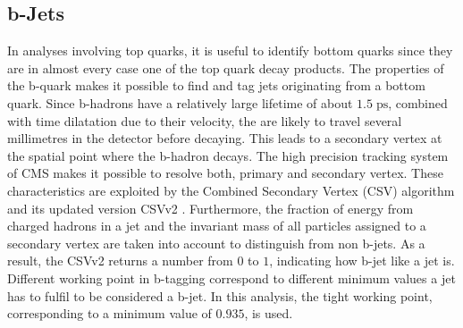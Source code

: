\subsection{b-Jets}
\label{sec:btag}
	In analyses involving top quarks, it is useful to identify bottom quarks since they are in almost every case one of the top quark decay products. The properties of the b-quark makes it possible to find and tag jets originating from a bottom quark. Since b-hadrons have a relatively large lifetime of about $1.5\;\text{ps}$, combined with time dilatation due to their velocity, the are likely to travel several millimetres in the detector before decaying. This leads to a secondary vertex at the spatial point where the b-hadron decays. The high precision tracking system of CMS makes it possible to resolve both, primary and secondary vertex. These characteristics are exploited by the Combined Secondary Vertex (CSV) algorithm \cite{csv} and its updated version CSVv2 \cite{btag}. Furthermore, the fraction of energy from charged hadrons in a jet and the invariant mass of all particles assigned to a secondary vertex are taken into account to distinguish from non b-jets. As a result, the CSVv2 returns a number from $0$ to $1$, indicating how b-jet like a jet is. Different working point in b-tagging correspond to different minimum values a jet has to fulfil to be considered a b-jet. In this analysis, the tight working point, corresponding to a minimum value of $0.935$, is used.

	
